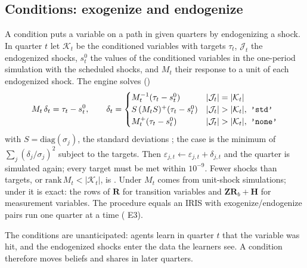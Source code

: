 \documentclass[11pt,a4paper]{article}
\DeclareRobustCommand{\codem}[1]{\texttt{\detokenize{#1}}}
\newcommand{\Rs}{\mathbf{R}}
\newcommand{\Z}{\mathbf{Z}}
\newcommand{\Hs}{\mathbf{H}}
\begin{document}
\subsection{Conditions: exogenize and endogenize}\label{sec:conditions}

A condition puts a variable on a path in given quarters by endogenizing a shock. In quarter $t$
let $\mathcal{K}_t$ be the conditioned variables with targets $\tau_t$, $\mathcal{J}_t$ the
endogenized shocks, $s^0_t$ the values of the conditioned variables in the one-period simulation
with the scheduled shocks, and $M_t$ their response to a unit of each endogenized shock. The engine
solves ()
\begin{equation}\label{eq:cond}
  M_t\,\delta_t = \tau_t - s^0_t,\qquad
  \delta_t =
  \begin{cases}
    M_t^{-1}(\tau_t - s^0_t) & |\mathcal{J}_t| = |\mathcal{K}_t|\\
    S\,(M_tS)^{+}(\tau_t - s^0_t) & |\mathcal{J}_t| > |\mathcal{K}_t|,\ \text{\codem{'std'}}\\
    M_t^{+}(\tau_t - s^0_t) & |\mathcal{J}_t| > |\mathcal{K}_t|,\ \text{\codem{'none'}}
  \end{cases}
\end{equation}
with $S = \mathrm{diag}(\sigma_j)$, the standard deviations ; the 
case is the minimum of $\sum_j(\delta_j/\sigma_j)^2$ subject to the targets. Then
$\varepsilon_{j,t}\leftarrow\varepsilon_{j,t}+\delta_{j,t}$ and the quarter is simulated again; every
target must be met within $10^{-9}$. Fewer shocks than targets, or $\mathrm{rank}\,M_t <
|\mathcal{K}_t|$, is . Under  $M_t$
comes from unit-shock simulations; under  it is exact: the rows of $\Rs$ for
transition variables and $\Z\Rs_b + \Hs$ for measurement variables. The procedure equals an IRIS
 with exogenize/endogenize pairs run one quarter at a time ( E3).

The conditions are unanticipated: agents learn in quarter $t$ that the variable was hit, and the
endogenized shocks enter the data the learners see. A condition therefore moves beliefs and shares
in later quarters.
\end{document}
